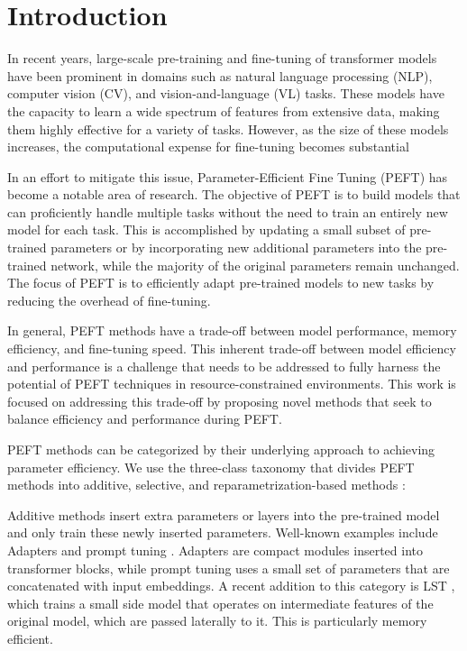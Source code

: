 \section{Introduction}

In recent  years, large-scale pre-training and fine-tuning of transformer models have been prominent in domains such as natural language processing (NLP), computer vision (CV), and vision-and-language (VL) tasks. These models have the capacity to learn a wide spectrum of features from extensive data, making them highly effective for a variety of tasks. However, as the size of these models increases, the computational expense for fine-tuning becomes substantial

In an effort to mitigate this issue, Parameter-Efficient Fine Tuning (PEFT) has become a notable area of research. The objective of PEFT is to build models that can proficiently handle multiple tasks without the need to train an entirely new model for each task. This is accomplished by updating a small subset of pre-trained parameters or by incorporating new additional parameters into the pre-trained network, while the majority of the original parameters remain unchanged. The focus of PEFT is to efficiently adapt pre-trained models to new tasks by reducing the overhead of fine-tuning.

In general, PEFT methods have a trade-off between model performance, memory efficiency, and fine-tuning speed. This inherent trade-off between model efficiency and performance is a challenge that needs to be addressed to fully harness the potential of PEFT techniques in resource-constrained environments. This work is focused on addressing this trade-off by proposing novel methods that seek to balance efficiency and performance during PEFT.

PEFT methods can be categorized by their underlying approach to achieving parameter efficiency. We use the three-class taxonomy that divides PEFT methods into additive, selective, and reparametrization-based methods \cite{peft-categories}:

Additive methods insert extra parameters or layers into the pre-trained model and only train these newly inserted parameters. Well-known examples include Adapters \cite{adapters} and prompt tuning \cite{prompt-tuning}. Adapters are compact modules inserted into transformer blocks, while prompt tuning uses a small set of parameters that are concatenated with input embeddings. A recent addition to this category is LST \cite{sung2022lst}, which trains a small side model that operates on intermediate features of the original model, which are passed laterally to it. This is particularly memory efficient. 

